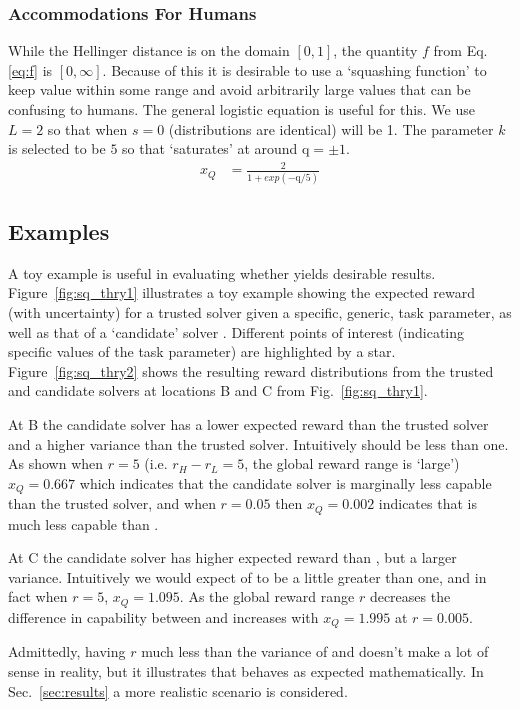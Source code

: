 \subsubsection{Accommodations For Humans}
While the Hellinger distance is on the domain $[0,1]$, the quantity $f$ from Eq. \ref{eq:f} is $[0,\infty]$. Because of this it is desirable to use a `squashing function' to keep \xQ{} value within some range and avoid arbitrarily large values that can be confusing to humans. The general logistic equation is useful for this.
We use $L=2$ so that when $s=0$ (distributions are identical) \xQ{} will be 1. The parameter $k$ is selected to be $5$ so that \xQ{} `saturates' at around $\text{q}=\pm1$.
\begin{align}
    x_{Q} &= \frac{2}{1+exp(-\text{q}/5)}\label{eq:SQ}
\end{align}

\subsection{Examples}
A toy example is useful in evaluating whether \xQ{} yields desirable results. Figure~\ref{fig:sq_thry1} illustrates a toy example showing the expected reward (with uncertainty) for a trusted solver \solvestar{} given a specific, generic, task parameter, as well as that of a `candidate' solver \solve. Different points of interest (indicating specific values of the task parameter) are highlighted by a star. Figure~\ref{fig:sq_thry2} shows the resulting reward distributions from the trusted and candidate solvers at locations B and C from Fig.~\ref{fig:sq_thry1}.

At B the candidate solver has a lower expected reward than the trusted solver and a higher variance than the trusted solver. Intuitively \xQ{} should be less than one. As shown when $r=5$ (i.e. $r_H-r_L=5$, the global reward range is `large') $x_Q=0.667$ which indicates that the candidate solver is marginally less capable than the trusted solver, and when $r=0.05$ then $x_Q=0.002$ indicates that \solve{} is much less capable than \solvestar.

At C the candidate solver \solve{} has higher expected reward than \solverstar, but a larger variance. Intuitively we would expect \xQ{} of \solve{} to be a little greater than one, and in fact when $r=5$, $x_Q=1.095$. As the global reward range $r$ decreases the difference in capability between \solve{} and \solvestar{} increases with $x_Q=1.995$ at $r=0.005$.

Admittedly, having $r$ much less than the variance of \solve{} and \solvestar{} doesn't make a lot of sense in reality, but it illustrates that \xQ{} behaves as expected mathematically. In Sec.~\ref{sec:results} a more realistic scenario is considered.


